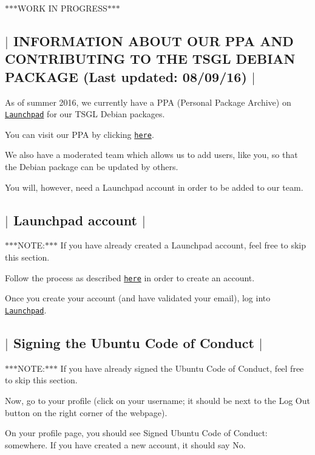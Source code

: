 $\ast$$\ast$$\ast$\-W\-O\-R\-K I\-N P\-R\-O\-G\-R\-E\-S\-S$\ast$$\ast$$\ast$ 

 \subsection*{$\vert$ I\-N\-F\-O\-R\-M\-A\-T\-I\-O\-N A\-B\-O\-U\-T O\-U\-R P\-P\-A A\-N\-D C\-O\-N\-T\-R\-I\-B\-U\-T\-I\-N\-G T\-O T\-H\-E T\-S\-G\-L D\-E\-B\-I\-A\-N P\-A\-C\-K\-A\-G\-E (Last updated\-: 08/09/16) $\vert$ }

As of summer 2016, we currently have a P\-P\-A (Personal Package Archive) on \href{https://launchpad.net/}{\tt Launchpad} for our T\-S\-G\-L Debian packages.

You can visit our P\-P\-A by clicking \href{https://launchpad.net/~tsgl-test/+archive/ubuntu/tsgl-dev}{\tt here}.

We also have a moderated team which allows us to add users, like you, so that the Debian package can be updated by others.

You will, however, need a Launchpad account in order to be added to our team. 

 \subsection*{$\vert$ Launchpad account $\vert$ }

$\ast$$\ast$$\ast$\-N\-O\-T\-E\-:$\ast$$\ast$$\ast$ If you have already created a Launchpad account, feel free to skip this section.

Follow the process as described \href{https://login.launchpad.net/+new_account}{\tt here} in order to create an account.

Once you create your account (and have validated your email), log into \href{https://launchpad.net/}{\tt Launchpad}. 

 \subsection*{$\vert$ Signing the Ubuntu Code of Conduct $\vert$ }

$\ast$$\ast$$\ast$\-N\-O\-T\-E\-:$\ast$$\ast$$\ast$ If you have already signed the Ubuntu Code of Conduct, feel free to skip this section.

Now, go to your profile (click on your username; it should be next to the {\ttfamily Log Out} button on the right corner of the webpage).

On your profile page, you should see {\ttfamily Signed Ubuntu Code of Conduct\-:} somewhere. If you have created a new account, it should say {\ttfamily No}.

